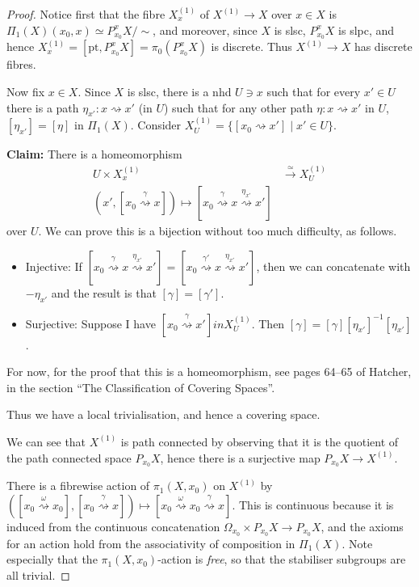 \documentclass{tufte-handout}
\def\pt {\mathrm{pt}}
\theoremstyle{definition}
\begin{document}
\begin{proof}
Notice first that the fibre $X^{(1)}_x$ of $X^{(1)} \to X$ over $x\in X$ is $\Pi_1(X)(x_0,x) \simeq P_{x_0}^xX/\sim$, and moreover, since $X$ is slsc, $P_{x_0}^xX$ is slpc, and hence $X^{(1)}_x=[\pt,P_{x_0}^xX]=\pi_0(P_{x_0}^xX)$ is discrete. Thus $X^{(1)} \to X$ has discrete fibres.

Now fix $x\in X$. Since $X$ is slsc, there is a nhd $U\ni x$ such that for every $x'\in U$ there is a path $\eta_{x'}\colon x\rightsquigarrow x'$ (in $U$) such that for any other path $\eta\colon x \rightsquigarrow x'$ in $U$, $[\eta_{x'}]=[\eta]$ in $\Pi_1(X)$. Consider $X^{(1)}_U = \{[x_0\rightsquigarrow x']\mid x'\in U\}$.

\textbf{Claim:} There is a homeomorphism 
\begin{align*}
U\times X^{(1)}_x & \xrightarrow{\simeq} X^{(1)}_U \\
(x',[x_0 \stackrel{\gamma}{\rightsquigarrow} x]) \mapsto [x_0 \stackrel{\gamma}{\rightsquigarrow} x \stackrel{\eta_{x'}}{\rightsquigarrow} x']
\end{align*}
over $U$. We can prove this is a bijection without too much difficulty, as follows. 
\begin{itemize}
\item Injective: If $[x_0 \stackrel{\gamma}{\rightsquigarrow} x \stackrel{\eta_{x'}}{\rightsquigarrow} x'] = [x_0 \stackrel{\gamma'}{\rightsquigarrow} x \stackrel{\eta_{x'}}{\rightsquigarrow} x']$, then we can concatenate with $-\eta_{x'}$ and the result is that $[\gamma] = [\gamma']$.
\item Surjective: Suppose I have $[x_0 \stackrel{\gamma}{\rightsquigarrow} x'] in X^{(1)}_U$. Then $[\gamma] = [\gamma][\eta_{x'}]^{-1}[\eta_{x'}]$.
\end{itemize}

For now, for the proof that this is a homeomorphism, see pages 64--65 of Hatcher, in the section ``The Classification of Covering Spaces''.

Thus we have a local trivialisation, and hence a covering space.

We can see that $X^{(1)}$ is path connected by observing that it is the quotient of the path connected space $P_{x_0} X$, hence there is a surjective map $P_{x_0}X \to X^{(1)}$. 

There is a fibrewise action of $\pi_1(X,x_0)$ on $X^{(1)}$ by $([x_0 \stackrel{\omega}{\rightsquigarrow} x_0],[x_0 \stackrel{\gamma}{\rightsquigarrow} x]) \mapsto [x_0 \stackrel{\omega}{\rightsquigarrow} x_0 \stackrel{\gamma}{\rightsquigarrow} x]$. This is continuous because it is induced from the continuous concatenation $\Omega_{x_0}\times P_{x_0}X \to P_{x_0}X$, and the axioms for an action hold from the associativity of composition in $\Pi_1(X)$. Note especially that the $\pi_1(X,x_0)$-action is \emph{free}, so that the stabiliser subgroups are all trivial.


\end{proof}
\end{document}
